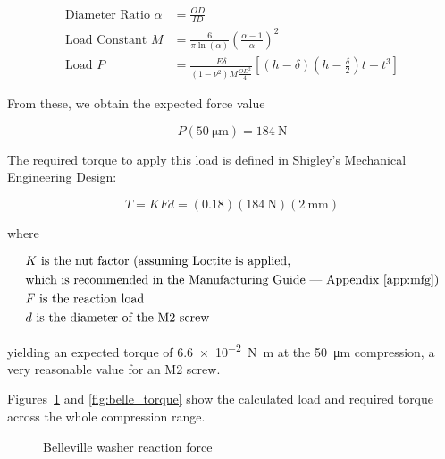 \documentclass[12pt, letterpaper]{report}%
\begin{document}
\begin{appendices}
			\begin{align}
					\text{Diameter Ratio } \alpha &= \frac{OD}{ID} \\
					\text{Load Constant } M &= \frac{6}{\pi \ln(\alpha)} \left( \frac{\alpha - 1}{\alpha} \right)^2 \\
					\text{Load } P &= \frac{E \delta}{(1 - \nu^2) M \frac{OD^2}{4}} \left[ \left( h - \delta \right) \left( h - \frac{\delta}{2} \right) t + t^3 \right]
			\end{align}

			From these, we obtain the expected force value

			\begin{equation}
				P(\SI{50}{\micro\meter}) = \SI{184}{\newton}
			\end{equation}

			The required torque to apply this load is defined in Shigley's Mechanical Engineering Design\cite[Eq.~8-27, Table~8-15]{ref_shigley}:

			\begin{equation}
				T = K F d = (0.18) (\SI{184}{\newton}) (\SI{2}{\milli\meter})
			\end{equation}

			where

			\begin{align*}
				&K \text{ is the nut factor (assuming Loctite is applied,} \\
				&\text{which is recommended in the Manufacturing Guide --- Appendix~\ref{app:mfg})} \\
				&F \text{ is the reaction load} \\
				&d \text{ is the diameter of the M2 screw}
			\end{align*}
			
			yielding an expected torque of \SI{6.6e-2}{\newton\meter} at the \SI{50}{\micro\meter} compression, a very reasonable value for an M2 screw.

			Figures~\ref{fig:belle_force} and \ref{fig:belle_torque} show the calculated load and required torque across the whole compression range.

			\begin{figure}[H]
				\centering
				\caption{Belleville washer reaction force}
				\label{fig:belle_force}
			\end{figure}


\end{appendices}
\end{document}
